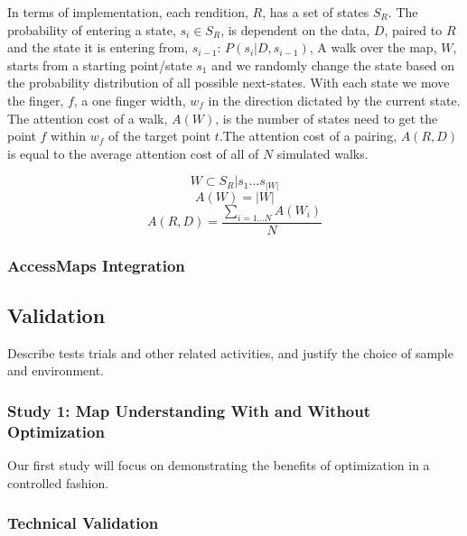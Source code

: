 \begin{description}
In terms of implementation, each rendition, $R$, has a set of states $S_R$. The probability of entering a state, $s_i\in S_R$, is dependent on the data, $D$, paired to $R$ and the state it is entering from, $s_{i-1}$: $P(s_i | D, s_{i-1})$, A walk over the map, $W$, starts from a starting point/state $s_1$ and we randomly change the state based on the probability distribution of all possible next-states. With each state we move the finger, $f$, a one finger width, $w_f$ in the direction dictated by the current state. The attention cost of a walk, $A(W)$, is the number of states need to get the point $f$ within $w_f$ of the target point $t$.The attention cost of a pairing, $A(R,D)$ is equal to the average attention cost of all of $N$ simulated walks.

\begin{equation}
W \subset S_R | s_1...s_{|W|}
\end{equation}
\begin{equation}
A(W) = |W|
\end{equation}
\begin{equation}
A(R,D) = \frac{\sum_{i=1...N} A(W_i)}{N}
\end{equation}
\end{description}

\subsubsection{AccessMaps Integration}
\label{sec:accessmaps-integration}



\subsection{Validation}
Describe tests trials and other related activities, and justify the choice of sample and environment. 
\subsubsection{Study 1: Map Understanding With and Without Optimization}
\label{sec:lab-tests}
Our first study will focus on demonstrating the benefits of optimization in a controlled fashion. 
\subsubsection{Technical Validation}

